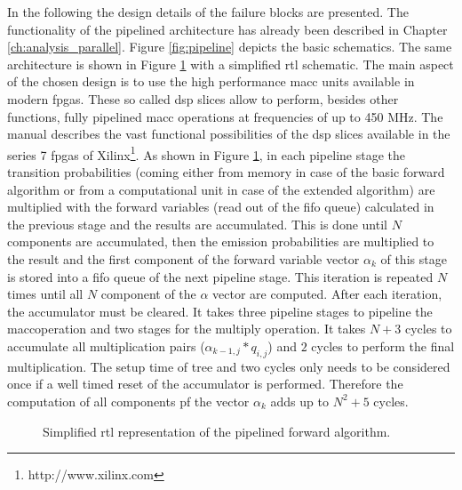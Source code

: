 \documentclass[mscthesis]{usiinfthesis}
\begin{document}
In the following the design details of the failure blocks are presented.
The functionality of the pipelined architecture has already been described in
Chapter \ref{ch:analysis_parallel}. Figure \ref{fig:pipeline} depicts the
basic schematics. The same architecture is shown in Figure \ref{fig:arch_pipe}
with a simplified \gls{rtl} schematic. The main aspect of the chosen design is
to use the high performance \gls{macc} units available in modern \glspl{fpga}.
These so called \gls{dsp} slices allow to perform, besides other functions,
fully pipelined \gls{macc} operations at frequencies of up to 450 MHz. The
manual \cite{xilinx_DSP} describes the vast functional possibilities of the
\gls{dsp} slices available in the series 7 \glspl{fpga} of
Xilinx\footnote{http://www.xilinx.com}. As shown in Figure \ref{fig:arch_pipe},
in each pipeline stage the transition probabilities (coming either from memory
in case of the basic forward algorithm or from a computational unit in case
of the extended algorithm) are multiplied with the forward variables (read out
of the \gls{fifo} queue) calculated in the previous stage and the results are
accumulated. This is done until $N$ components are accumulated, then the
emission probabilities are multiplied to the result and the first component of
the forward variable vector $\alpha_k$ of this stage is stored into a \gls{fifo}
queue of the next pipeline stage. This iteration is repeated $N$ times until
all $N$ component of the $\alpha$ vector are computed. After each iteration,
the accumulator must be cleared. It takes three pipeline stages to pipeline the
\gls{macc}operation and two stages for the multiply operation. It takes $N+3$
cycles to accumulate all multiplication pairs ($\alpha_{k-1, j} * q_{i,j}$) and
$2$ cycles to perform the final multiplication. The setup time of tree and two
cycles only needs to be considered once if a well timed reset of the
accumulator is performed. Therefore the computation of all components pf the
vector $\alpha_k$ adds up to $N^2+5$ cycles.
\begin{figure}
    \centering
    
    \caption{Simplified \acrshort{rtl} representation of the pipelined forward
        algorithm.}
    \label{fig:arch_pipe}
\end{figure}
\end{document}
